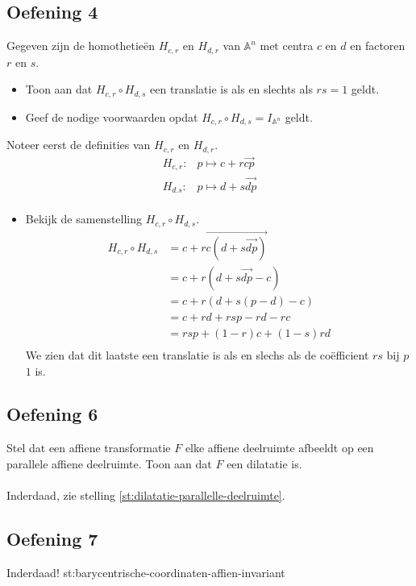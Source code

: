 \documentclass[main.tex]{subfiles}
\begin{document}
\subsection*{Oefening 4}
Gegeven zijn de homothetie\"en $H_{c,r}$ en $H_{d,r}$ van $\mathbb{A}^{n}$ met centra $c$ en $d$ en factoren $r$ en $s$.
\begin{itemize}
\item Toon aan dat $H_{c,r} \circ H_{d,s}$ een translatie is als en slechts als $rs = 1$ geldt.
\item Geef de nodige voorwaarden opdat $H_{c,r} \circ H_{d,s} = I_{\mathbb{A}^{n}}$ geldt. 
\end{itemize}
Noteer eerst de definities van $H_{c,r}$ en $H_{d,r}$.
\[
\begin{array}{rl}
  H_{c,r}: & p \mapsto c + r\overrightarrow{cp}\\
  H_{d.s}: & p \mapsto d + s\overrightarrow{dp}\\ 
\end{array}
\]
\begin{itemize}
\item Bekijk de samenstelling $H_{c,r} \circ H_{d,s}$.
\[
\begin{array}{rl}
  H_{c,r} \circ H_{d,s} &= c + r\overrightarrow{c(d+s\overrightarrow{dp})}\\
                      &= c + r(d + s\overrightarrow{dp} - c)\\
                      &= c + r(d + s(p-d) -c)\\
                      &= c + rd + rsp -rd -rc \\
                      &= rsp + (1-r)c + (1-s)rd\\
\end{array}
\] 
We zien dat dit laatste een translatie is als en slechs als de co\"efficient $rs$ bij $p$ $1$ is.
\end{itemize}

\subsection*{Oefening 6}
Stel dat een affiene transformatie $F$ elke affiene deelruimte afbeeldt op een parallele affiene deelruimte.
Toon aan dat $F$ een dilatatie is.\\\\
Inderdaad, zie stelling \ref{st:dilatatie-parallelle-deelruimte}.



\subsection*{Oefening 7}
Inderdaad! {st:barycentrische-coordinaten-affien-invariant}
\end{document}
